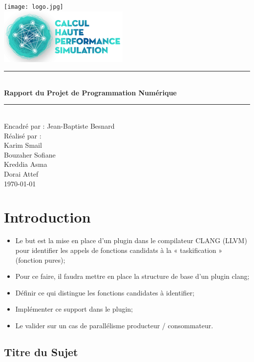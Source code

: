 \documentclass[12pt,titlepage]{article}
\begin{document}
\begin{titlepage}
\newcommand{\HRule}{\rule{\linewidth}{0.1mm}}
\center

\texttt{[image: logo.jpg]} \\[0.2cm]
\includegraphics[scale=0.7]{CHPS_logo.png} \\[0.2cm]

\HRule \\[0.4cm]
{ \huge \bfseries Rapport du Projet de Programmation Numérique 
  \\[0.15cm] }
\HRule \\[1.5cm]
Encadré par : Jean-Baptiste Besnard
\\Réalisé par : \\ Karim Smail\\ Bouzaher Sofiane  \\ Kreddia Asma \\Dorai Attef 
\\[1cm]
\today \\ [1cm]
\end{titlepage}


\section{Introduction}


\begin{itemize}
	\item Le but est la mise en place d’un plugin dans le compilateur
	CLANG (LLVM) pour identifier les appels de fonctions candidats à la « taskification » (fonction pures);
	\item Pour ce faire, il faudra mettre en place la structure de base
	d’un plugin clang;
	\item Définir ce qui distingue les fonctions candidates à identifier;
	\item Implémenter ce support dans le plugin;
	\item Le valider sur un cas de parallélisme producteur /
	consommateur.
\end{itemize}


\subsection{Titre du Sujet}
\end{document}
